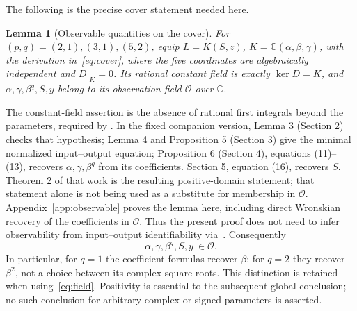 \documentclass[10pt,a4paper]{article}
\newtheorem{lemma}[theorem]{Lemma}
\newcommand{\C}{\mathbb C}
\begin{document}
The following is the precise cover statement needed here.
\begin{lemma}[Observable quantities on the cover]
\label{lem:observable}
For $(p,q)=(2,1),(3,1),(5,2)$, equip
$L=K(S,z)$, $K=\C(\alpha,\beta,\gamma)$, with the derivation
in~\eqref{eq:cover}, where the five coordinates are algebraically
independent and $D|_K=0$. Its rational constant field is exactly
$\ker D=K$, and $\alpha,\gamma,\beta^q,S,y$ belong to its
observation field $\mathcal O$ over $\C$.
\end{lemma}
The constant-field assertion is the absence of rational first
integrals beyond the parameters, required by
\cite[Theorem 4.7]{OPT}. In the fixed companion version,
Lemma 3 (Section 2) checks that hypothesis; Lemma 4 and Proposition 5
(Section 3) give the minimal normalized input--output equation;
Proposition 6 (Section 4), equations (11)--(13), recovers
$\alpha,\gamma,\beta^q$ from its coefficients. Section 5,
equation (16), recovers $S$. Theorem 2 of that work is the resulting
positive-domain statement; that statement alone is not being used
as a substitute for membership in $\mathcal O$.
Appendix~\ref{app:observable} proves the lemma here, including direct
Wronskian recovery of the coefficients in $\mathcal O$. Thus the
present proof does not need to infer observability from
input--output identifiability via~\cite[Corollary 5.7]{OPT}.
Consequently
\begin{equation}
\alpha,\gamma,\beta^q,S,y\ \in\mathcal O.
\label{eq:observable}
\end{equation}
In particular, for $q=1$ the coefficient formulas recover $\beta$;
for $q=2$ they recover $\beta^2$, not a choice between its complex
square roots. This distinction is retained when using~\eqref{eq:field}.
Positivity is essential to the subsequent global conclusion; no such
conclusion for arbitrary complex or signed parameters is asserted.
\end{document}
